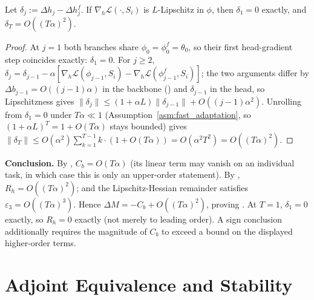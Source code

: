\begin{lemma}
\label{lem:head_div}
Let $\delta_j:=\Delta h_j-\Delta h_j^f$. If $\nabla_h\mathcal{L}(\cdot,S_i)$ is $L$-Lipschitz in $\phi$, then $\delta_1=0$ exactly, and $\delta_T=O((T\alpha)^2)$.
\end{lemma}
\begin{proof}
At $j{=}1$ both branches share $\phi_0=\phi_0^f=\theta_0$, so their first head-gradient step coincides exactly: $\delta_1=0$. For $j\ge2$, $\delta_j=\delta_{j-1}-\alpha[\nabla_h\mathcal{L}(\phi_{j-1},S_i)-\nabla_h\mathcal{L}(\phi_{j-1}^f,S_i)]$; the two arguments differ by $\Delta b_{j-1}=O((j{-}1)\alpha)$ in the backbone () and $\delta_{j-1}$ in the head, so Lipschitzness gives $\|\delta_j\|\le(1{+}\alpha L)\|\delta_{j-1}\|+O((j{-}1)\alpha^2)$. Unrolling from $\delta_1=0$ under $T\alpha\ll1$ (Assumption~\ref{asm:fast_adaptation}, so $(1+\alpha L)^{T}=1+O(T\alpha)$ stays bounded) gives $\|\delta_T\|\le O(\alpha^2)\sum_{k=1}^{T-1}k\cdot(1+O(T\alpha))=O(\alpha^2T^2)=O((T\alpha)^2)$.
\end{proof}

\noindent\textbf{Conclusion.} By , $C_b=O(T\alpha)$ (its linear term may vanish on an individual task, in which case this is only an upper-order statement). By , $R_h=O((T\alpha)^2)$; and the Lipschitz-Hessian remainder satisfies $\varepsilon_3=O((T\alpha)^3)$. Hence $\Delta M=-C_b+O((T\alpha)^2)$, proving . At $T{=}1$, $\delta_1{=}0$ exactly, so $R_h{=}0$ exactly (not merely to leading order). A sign conclusion additionally requires the magnitude of $C_b$ to exceed a bound on the displayed higher-order terms.

\section{Adjoint Equivalence and Stability}
\label{app:adjoint}

